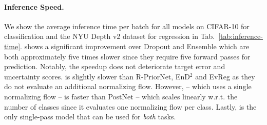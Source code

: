 \paragraph{Inference Speed.} We show the average inference time per batch for all models on CIFAR-10 for classification and the NYU Depth v2 dataset for regression in Tab.~\ref{tab:inference-time}. \NatPNacro{} shows a significant improvement over Dropout and Ensemble which are both approximately five times slower since they require five forward passes for prediction. Notably, the \NatPNacro{} speedup does not deteriorate target error and uncertainty scores. \NatPNacro{} is slightly slower than R-PriorNet, EnD$^2$ and EvReg as they do not evaluate an additional normalizing flow. However, \NatPNacro{} -- which uses a single normalizing flow -- is faster than PostNet -- which scales linearly w.r.t. the number of classes since it evaluates one normalizing flow per class. Lastly, \NatPNacro{} is the only single-pass model that can be used for \emph{both} tasks.


